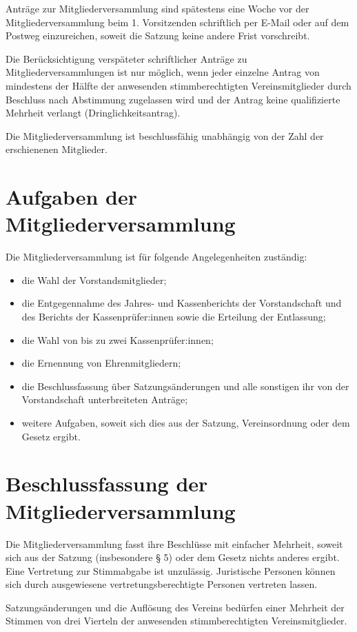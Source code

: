 \documentclass[10pt,a4paper]{article}
\begin{document}
Anträge zur Mitgliederversammlung sind spätestens eine Woche vor der Mitgliederversammlung beim 1.
Vorsitzenden schriftlich per E-Mail oder auf dem Postweg einzureichen, soweit die Satzung keine andere Frist
vorschreibt.

Die Berücksichtigung verspäteter schriftlicher Anträge zu Mitgliederversammlungen ist nur möglich,
wenn jeder einzelne Antrag von mindestens der Hälfte der anwesenden stimmberechtigten Vereinsmitglieder durch
Beschluss nach Abstimmung zugelassen wird und der Antrag keine qualifizierte Mehrheit verlangt (Dringlichkeitsantrag).

Die Mitgliederversammlung ist beschlussfähig unabhängig von der Zahl der erschienenen Mitglieder.
\section{Aufgaben der Mitgliederversammlung}
Die Mitgliederversammlung ist für folgende Angelegenheiten zuständig:
\begin{itemize}
\item
die Wahl der Vorstandsmitglieder;
\item
die Entgegennahme des Jahres- und Kassenberichts der Vorstandschaft und des
Berichts der Kassenprüfer:innen sowie die Erteilung der Entlassung;
\item
die Wahl von bis zu zwei Kassenprüfer:innen;
\item
die Ernennung von Ehrenmitgliedern;
\item
die Beschlussfassung über Satzungsänderungen und alle sonstigen ihr von der
Vorstandschaft unterbreiteten Anträge;
\item
weitere Aufgaben, soweit sich dies aus der Satzung, Vereinsordnung oder dem
Gesetz ergibt.
\end{itemize}
\section{Beschlussfassung der Mitgliederversammlung}
Die Mitgliederversammlung fasst ihre Beschlüsse mit einfacher Mehrheit, soweit sich aus der Satzung
(insbesondere § 5) oder dem Gesetz nichts anderes ergibt. Eine Vertretung zur Stimmabgabe ist unzulässig.
Juristische Personen können sich durch ausgewiesene vertretungsberechtigte Personen vertreten lassen.

Satzungsänderungen und die Auflösung des Vereins bedürfen einer Mehrheit der Stimmen von drei Vierteln der
anwesenden stimmberechtigten Vereinsmitglieder.
\end{document}
